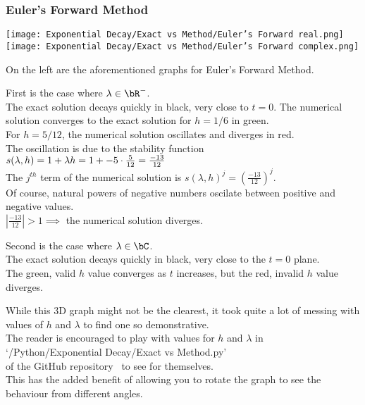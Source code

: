 \subsubsection{Euler's Forward Method}
\begin{multicols}{2}
	\begin{center}
	\texttt{[image: Exponential Decay/Exact vs Method/Euler's Forward real.png]}
        \texttt{[image: Exponential Decay/Exact vs Method/Euler's Forward complex.png]}
	\end{center}
\columnbreak{}
	\par On the left are the aforementioned graphs for Euler's Forward Method.\\
	
	\par First is the case where $\lambda \in \bR^{-}$.\\
	The exact solution decays quickly in black, very close to $t=0$.
	The numerical solution converges to the exact solution for $h = 1/6$ in green.\\
	For $h = 5/12$, the numerical solution oscillates and diverges in red.\\
	The oscillation is due to the stability function\\
	$s(\lambda, h) = 1 + \lambda h = 1 + -5\cdot\frac{5}{12} = \frac{-13}{12}$\\
	The $j^{th}$ term of the numerical solution is ${s(\lambda, h)}^j = {\left(\frac{-13}{12}\right)}^j$.\\
	Of course, natural powers of negative numbers oscilate between positive and negative values.\\
	$|\frac{-13}{12}| > 1 \implies$ the numerical solution diverges.\\

	\par Second is the case where $\lambda \in \bC$.\\
	The exact solution decays quickly in black, very close to the $t=0$ plane.\\
	The green, valid $h$ value converges as $t$ increases, but the red, invalid $h$ value diverges.\\
        
        \par While this 3D graph might not be the clearest, it took quite a lot of messing with values of $h$ and $\lambda$ to find one so demonstrative.\\
	The reader is encouraged to play with values for $h$ and $\lambda$ in \\
	`/Python/Exponential Decay/Exact vs Method.py'\\
	of the GitHub repository~\cite{GitHub_Repo} to see for themselves.\\
	This has the added benefit of allowing you to rotate the graph to see the behaviour from different angles.
\end{multicols}

